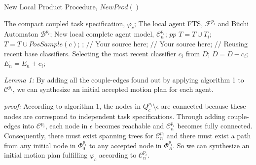 \documentclass[journal]{IEEEtran}
\begin{document}
\begin{algorithm}[ha]
  \caption{ New Local Product Procedure, $NewProd()$ }
  \label{alg:Framwork}
  \begin{algorithmic}[1]
    \Require
      The compact coupled task specification, $\varphi_c$;
      The local agent FTS, $\mathcal{F}^{p_i}$ and B\"{u}chi Automaton $\mathcal{B}^{p_i}$;
    \Ensure
      New local complete agent model, $\mathcal{C}^{p_i}_n$;
            \State $pp$
          \EndFor
          \State $T=T\cup T_{i};$
        \EndFor
          \label{code:TrainBase:getc}
          \State $T=T\cup PosSample(c)$;
          \label{code:TrainBase:pos}
        \EndFor;
          \State $//$ Your source here;
        \EndFor
          \State $//$ Your source here;
        \EndFor
        \State $//$ Reusing recent base classifiers.
        \label{code:recentStart}
          \State Selecting the most recent classifier $c_i$ from $D$;
          \State $D=D-c_i$;
          \State $E_n=E_n+c_i$;
        \EndWhile
        \label{code:recentEnd}
  \end{algorithmic}
\end{algorithm}
\emph{Lemma 1:} By adding all the couple-edges found out by applying algorithm 1 to $\mathcal{C}^{p_i}$, we can synthesize an initial accepted motion plan for each agent.\par
\emph{proof:} According to algorithm 1, the nodes in $Q_c^{p_i} \setminus \epsilon$ are connected because these nodes are correspond to independent task specifications. Through adding couple-edges into $\mathcal{C}^{p_i}$, each node in $\epsilon$ becomes reachable and $\mathcal{C}^{p_i}_n$ becomes fully connected. Consequently, there must exist spanning trees for $\mathcal{C}^{p_i}_n$ and there must exist a path from any initial node in $\Phi_0^{p_i}$ to any accepted node in $\Phi_A^{p_i}$. So we can synthesize an initial motion plan fulfilling $\varphi_c$ according to $\mathcal{C}^{p_i}_n$.
\end{document}

